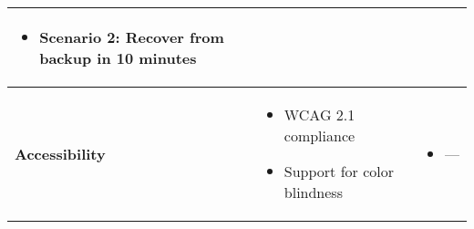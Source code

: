 \begin{longtable}{|p{4.2cm}|p{6.8cm}|p{5.8cm}|}
\begin{itemize}
        \item Scenario 2: Recover from backup in 10 minutes
    \end{itemize} \\
    \hline
    \textbf{Accessibility} &
    \begin{itemize}
        \item WCAG 2.1 compliance
        \item Support for color blindness
    \end{itemize} &
    \begin{itemize}
        \item ---
    \end{itemize} \\
    \hline
\end{longtable}
